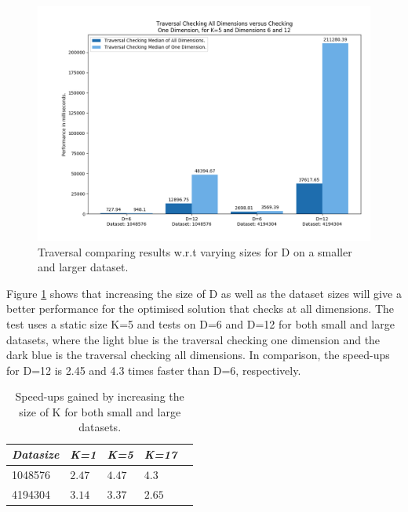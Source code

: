 \begin{figure}[H]
\centering
\includegraphics[width=1\textwidth]{pics/plot-figs/new-trav-k5-d6d12.png}
\caption{Traversal comparing results w.r.t varying sizes for D on a smaller and larger dataset.}
\label{fig:trav1}
\end{figure}

Figure \ref{fig:trav1} shows that increasing the size of D as well as the dataset sizes will give a better performance for the optimised solution that checks at all dimensions. The test uses a static size K=5 and tests on D=6 and D=12 for both small and large datasets, where the light blue is the traversal checking one dimension and the dark blue is the traversal checking all dimensions. In comparison, the speed-ups for D=12 is 2.45 and 4.3 times faster than D=6, respectively. 


\begin{table}[H]
\centering
\begin{tabular}{@{} *5l @{}}    \toprule
\emph{Datasize} & \emph{K=1} & \emph{K=5} & \emph{K=17} &  \\\midrule
1048576     & $2.47$  & $4.47$  & $4.3$  &   \\ 
4194304     & $3.14$ & $3.37$ & $2.65$ & \\ \bottomrule
 \hline
\end{tabular}
\caption{Speed-ups gained by increasing the size of K for both small and large datasets.}
\label{tab:travk}
\end{table}

